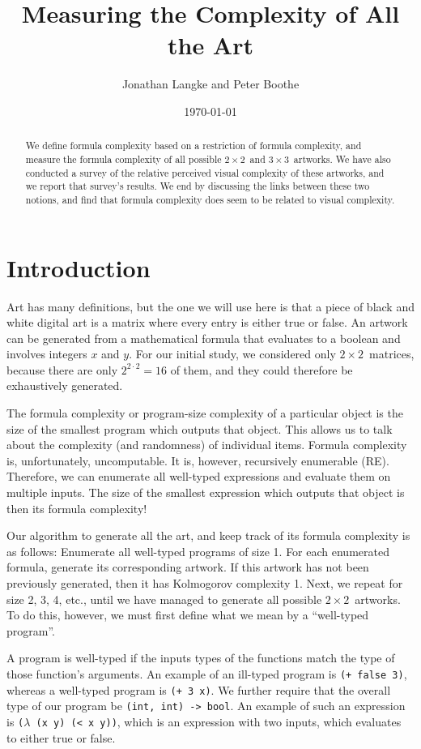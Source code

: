 \documentclass[11pt]{article}
\title{Measuring the Complexity of All the Art}
\author{Jonathan Langke and Peter Boothe}
\date{\today}
\newcommand{\twoxtwo}{$2\times2$}
\newcommand{\threexthree}{$3\times3$}
\begin{document}
\maketitle

\begin{abstract}
We define formula complexity based on a restriction of formula complexity,
and measure the formula complexity of all possible \twoxtwo\ and \threexthree\
artworks.  We have also conducted a survey of the relative perceived visual
complexity of these artworks, and we report that survey's results.  We end by
discussing the links between these two notions, and find that formula
complexity does seem to be related to visual complexity.
\end{abstract}

\section{Introduction}

Art has many definitions, but the one we will use here is that a piece of black
and white digital art is a matrix where every entry is either true or false.
An artwork can be generated from a mathematical formula that evaluates to a
boolean and involves integers $x$ and $y$.  For our initial study, we
considered only \twoxtwo\ matrices, because there are only $2^{2\cdot2} = 16$
of them, and they could therefore be exhaustively generated.

The formula complexity or program-size complexity of a particular object is
the size of the smallest program which outputs that object.  This allows us to
talk about the complexity (and randomness) of individual items. Formula
complexity is, unfortunately, uncomputable.  It is, however, recursively
enumerable (RE).  Therefore, we can enumerate all well-typed expressions and
evaluate them on multiple inputs.  The size of the smallest expression which
outputs that object is then its formula complexity!

Our algorithm to generate all the art, and keep track of its formula
complexity is as follows: Enumerate all well-typed programs of size 1.  For
each enumerated formula, generate its corresponding artwork.  If this artwork
has not been previously generated, then it has Kolmogorov complexity 1.  Next,
we repeat for size 2, 3, 4, etc., until we have managed to generate all
possible \twoxtwo\ artworks.  To do this, however, we must first define what we
mean by a ``well-typed program''.

A program is well-typed if the inputs types of the functions match the type of
those function's arguments.  An example of an ill-typed program is {\tt (+
false 3)}, whereas a well-typed program is {\tt (+ 3 x)}.  We further require
that the overall type of our program be {\tt (int, int) -> bool}.  An example
of such an expression is {\tt ($\lambda$ (x y) (< x y))}, which is an
expression with two inputs, which evaluates to either true or false.
\end{document}
